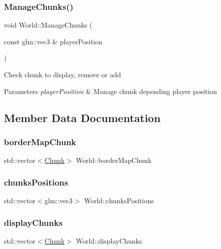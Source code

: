 \subsubsection{\texorpdfstring{Manage\+Chunks()}{ManageChunks()}}
{\footnotesize\ttfamily void World\+::\+Manage\+Chunks (\begin{DoxyParamCaption}\item[{const glm\+::vec3 \&}]{player\+Position }\end{DoxyParamCaption})}



Check chunk to display, remove or add 


\begin{DoxyParams}{Parameters}
{\em player\+Position} & Manage chunk depending player position\\
\hline
\end{DoxyParams}


\subsection{Member Data Documentation}
\mbox{\label{class_world_a95f77db4f1f090d83cfbe031a1fae4b8}} 
\subsubsection{\texorpdfstring{border\+Map\+Chunk}{borderMapChunk}}
{\footnotesize\ttfamily std\+::vector$<$\mbox{\hyperlink{class_chunk}{Chunk}}$>$ World\+::border\+Map\+Chunk}

\mbox{\label{class_world_a727bf1fe57704b805cdb3c2bfb26dd7b}} 
\subsubsection{\texorpdfstring{chunks\+Positions}{chunksPositions}}
{\footnotesize\ttfamily std\+::vector$<$glm\+::vec3$>$ World\+::chunks\+Positions}

\mbox{\label{class_world_a4a23a21bb61c5f461db659c30037e79f}} 
\subsubsection{\texorpdfstring{display\+Chunks}{displayChunks}}
{\footnotesize\ttfamily std\+::vector$<$\mbox{\hyperlink{class_chunk}{Chunk}}$>$ World\+::display\+Chunks}

